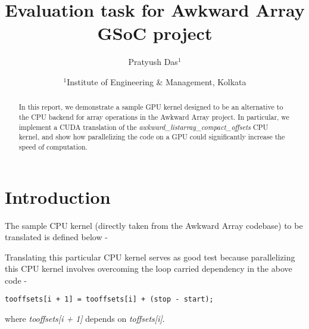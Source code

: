 \documentclass{article}
\title{Evaluation task for Awkward Array GSoC project}
\author{Pratyush Das$^1$}
\date{%
    $^1$Institute of Engineering \& Management, Kolkata\\%
}
\begin{document}
\maketitle

\begin{abstract}

    In this report, we demonstrate a sample GPU kernel designed to be an alternative to the CPU backend for array operations in the Awkward Array project. In particular, we implement a CUDA translation of the \textit{awkward\_listarray\_compact\_offsets} CPU kernel, and show how parallelizing the code on a GPU could significantly increase the speed of computation.

\end{abstract}

\section{Introduction}

The sample CPU kernel (directly taken from the Awkward Array codebase) to be translated is defined below -

Translating this particular CPU kernel serves as good test because parallelizing this CPU kernel involves overcoming the loop carried dependency in the above code -
\begin{lstlisting}
tooffsets[i + 1] = tooffsets[i] + (stop - start);
\end{lstlisting}
where \textit{tooffsets[i + 1]} depends on \textit{toffsets[i]}.
\end{document}
